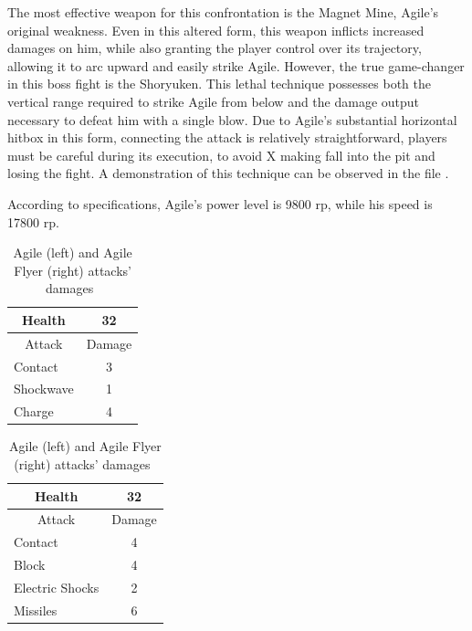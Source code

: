 The most effective weapon for this confrontation is the Magnet Mine, Agile's original weakness. Even in this altered form, this weapon inflicts increased damages on him, while also granting the player control over its trajectory, allowing it to arc upward and easily strike Agile. However, the true game-changer in this boss fight is the Shoryuken. This lethal technique possesses both the vertical range required to strike Agile from below and the damage output necessary to defeat him with a single blow. Due to Agile's substantial horizontal hitbox in this form, connecting the attack is relatively straightforward, players must be careful during its execution, to avoid X making fall into the pit and losing the fight. A demonstration of this technique can be observed in the file .

According to specifications, Agile's power level is 9800 rp, while his speed is 17800 rp.

\begin{table}[htp]
	\begin{minipage}{.45\linewidth}
		\centering
		\begin{tabular}[h]{l c }
			\toprule
			\multicolumn{1}{c}{Health}  & 32 \\
			\midrule
			\multicolumn{1}{c}{Attack} & \multicolumn{1}{c}{Damage}\\
			Contact & 3\\
			Shockwave& 1\\
			Charge& 4\\
			\bottomrule
		\end{tabular}
	\end{minipage}
	\begin{minipage}{.45\linewidth}
		\centering
		\begin{tabular}[h]{l c }
			\toprule
			\multicolumn{1}{c}{Health}  & 32 \\
			\midrule
			\multicolumn{1}{c}{Attack} & \multicolumn{1}{c}{Damage}\\
			Contact & 4 \\
			Block & 4\\
			Electric Shocks & 2\\
			Missiles& 6\\
			\bottomrule
		\end{tabular}
	\end{minipage}
	\caption{Agile (left) and Agile Flyer (right) attacks' damages~\cite{wiki:Agile,book:Compendium}}
\end{table}

